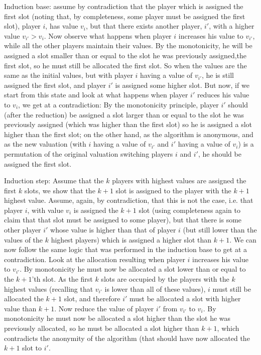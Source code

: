 \documentclass[a4page,notitlepage]{article}
\begin{document}
\begin{enumerate}
\begin{enumerate}
      Induction base: assume by contradiction that the player which is assigned the first slot (noting that, by completeness, some player must be assigned the first slot), player $i$, has value $v_i$, but that there exists another player, $i'$, with a higher value $v_{i'}>v_i$.
      Now observe what happens when player $i$ increases his value to $v_{i'}$, while all the other players maintain their values.
      By the monotonicity, he will be assigned a slot smaller than or equal to the slot he was previously assigned,the first slot, so he must still be allocated the first slot.
      So when the values are the same as the initial values, but with player $i$ having a value of $v_{i'}$, he is still assigned the first slot, and player $i'$ is assigned some higher slot.
      But now, if we start from this state and look at what happens when player $i'$ reduces his value to $v_i$, we get at a contradiction:
      By the monotonicity principle, player $i'$ should (after the reduction) be assigned a slot larger than or equal to the slot he was previously assigned (which was higher than the first slot) so he is assigned a slot higher than the first slot; on the other hand, as the algorithm is anonymous, and as the new valuation (with $i$ having a value of $v_{i'}$ and $i'$ having a value of $v_i$) is a permutation of the original valuation switching players $i$ and $i'$, he should be assigned the first slot.

      Induction step:
      Assume that the $k$ players with highest values are assigned the first $k$ slots, we show that the $k+1$ slot is assigned to the player with the $k+1$ highest value.
      Assume, again, by contradiction, that this is not the case, i.e. that player $i$, with value $v_i$ is assigned the $k+1$ slot (using completeness again to claim that that slot must be assigned to some player), but that there is some other player $i'$ whose value is higher than that of player $i$ (but still lower than the values of the $k$ highest players) which is assigned a higher slot than $k+1$.
      We can now follow the same logic that was performed in the induction base to get at a contradiction.
      Look at the allocation resulting when player $i$ increases his value to $v_{i'}$.
      By monotonicity he must now be allocated a slot lower than or equal to the $k+1$'th slot.
      As the first $k$ slots are occupied by the players with the $k$ highest values (recalling that $v_{i'}$ is lower than all of these values), $i$ must still be allocated the $k+1$ slot, and therefore $i'$ must be allocated a slot with higher value than $k+1$.
      Now reduce the value of player $i'$ from $v_{i'}$ to $v_i$.
      By monotonicity he must now be allocated a slot higher than the slot he was previously allocated, so he must be allocated a slot higher than $k+1$, which contradicts the anonymity of the algorithm (that should have now allocated the $k+1$ slot to $i'$.
      

\end{enumerate}
\end{enumerate}
\end{document}
